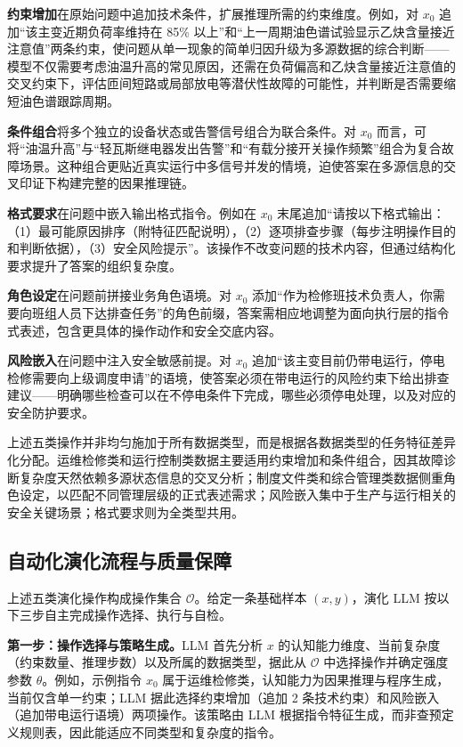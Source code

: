 \documentclass[fontset=fandol,type=master,campus=shenzhen,etitleauto=true]{hithesisbook}
\begin{document}
\textbf{约束增加}在原始问题中追加技术条件，扩展推理所需的约束维度。例如，对 $x_0$ 追加``该主变近期负荷率维持在 85\% 以上''和``上一周期油色谱试验显示乙炔含量接近注意值''两条约束，使问题从单一现象的简单归因升级为多源数据的综合判断------模型不仅需要考虑油温升高的常见原因，还需在负荷偏高和乙炔含量接近注意值的交叉约束下，评估匝间短路或局部放电等潜伏性故障的可能性，并判断是否需要缩短油色谱跟踪周期。

\textbf{条件组合}将多个独立的设备状态或告警信号组合为联合条件。对 $x_0$ 而言，可将``油温升高''与``轻瓦斯继电器发出告警''和``有载分接开关操作频繁''组合为复合故障场景。这种组合更贴近真实运行中多信号并发的情境，迫使答案在多源信息的交叉印证下构建完整的因果推理链。

\textbf{格式要求}在问题中嵌入输出格式指令。例如在 $x_0$ 末尾追加``请按以下格式输出：（1）最可能原因排序（附特征匹配说明），（2）逐项排查步骤（每步注明操作目的和判断依据），（3）安全风险提示''。该操作不改变问题的技术内容，但通过结构化要求提升了答案的组织复杂度。

\textbf{角色设定}在问题前拼接业务角色语境。对 $x_0$ 添加``作为检修班技术负责人，你需要向班组人员下达排查任务''的角色前缀，答案需相应地调整为面向执行层的指令式表述，包含更具体的操作动作和安全交底内容。

\textbf{风险嵌入}在问题中注入安全敏感前提。对 $x_0$ 追加``该主变目前仍带电运行，停电检修需要向上级调度申请''的语境，使答案必须在带电运行的风险约束下给出排查建议------明确哪些检查可以在不停电条件下完成，哪些必须停电处理，以及对应的安全防护要求。

上述五类操作并非均匀施加于所有数据类型，而是根据各数据类型的任务特征差异化分配。运维检修类和运行控制类数据主要适用约束增加和条件组合，因其故障诊断复杂度天然依赖多源状态信息的交叉分析；制度文件类和综合管理类数据侧重角色设定，以匹配不同管理层级的正式表述需求；风险嵌入集中于生产与运行相关的安全关键场景；格式要求则为全类型共用。

\subsection{自动化演化流程与质量保障}\label{ux4ebaux673aux534fux540cux5ba1ux6838ux673aux5236}

上述五类演化操作构成操作集合 $\mathcal{O}$。给定一条基础样本 $(x, y)$，演化 LLM 按以下三步自主完成操作选择、执行与自检。

\textbf{第一步：操作选择与策略生成。}LLM 首先分析 $x$ 的认知能力维度、当前复杂度（约束数量、推理步数）以及所属的数据类型，据此从 $\mathcal{O}$ 中选择操作并确定强度参数 $\theta$。例如，示例指令 $x_0$ 属于运维检修类，认知能力为因果推理与程序生成，当前仅含单一约束；LLM 据此选择约束增加（追加 2 条技术约束）和风险嵌入（追加带电运行语境）两项操作。该策略由 LLM 根据指令特征生成，而非查预定义规则表，因此能适应不同类型和复杂度的指令。
\end{document}
